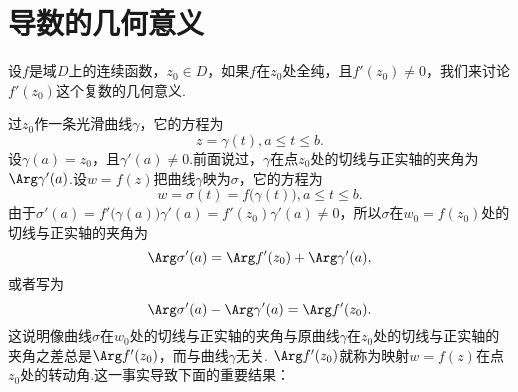 \section{导数的几何意义\label{sec2.3}}
设$f$是域$D$上的连续函数，$z_0\in D$，如果$f$在$z_0$处全纯，且$f'(z_0)\ne0$，我们来讨论$f'(z_0)$这个复数的几何意义.

过$z_0$作一条光滑曲线$\gamma$，它的方程为
\[
  z = \gamma(t), a \le t \le b.
\]
设$\gamma(a)=z_0$，且$\gamma'(a)\ne0$.前面说过，$\gamma$在点$z_0$处的切线与正实轴的夹角为$\Arg\gamma'(a)$.设$w=f(z)$把曲线$\gamma$映为$\sigma$，它的方程为\[w=\sigma(t)=f\big(\gamma(t)\big),a\le t\le b.\]
由于$\sigma'(a)=f'\big(\gamma(a)\big)\gamma'(a)=f'(z_0)\gamma'(a)\ne0$，所以$\sigma$在$w_0=f(z_0)$处的切线与正实轴的夹角为
\[
  \Arg\sigma'(a) = \Arg f'(z_0) + \Arg \gamma'(a),
\]
或者写为
\begin{equation}\label{eq2.3.1}
  \Arg\sigma'(a) - \Arg \gamma'(a) = \Arg f'(z_0).
\end{equation}
这说明像曲线$\sigma$在$w_0$处的切线与正实轴的夹角与原曲线$\gamma$在$z_0$处的切线与正实轴的夹角之差总是$\Arg f'(z_0)$，而与曲线$\gamma$无关.
$\Arg f'(z_0)$就称为映射$w=f(z)$在点$z_0$处的转动角.这一事实导致下面的重要结果：

